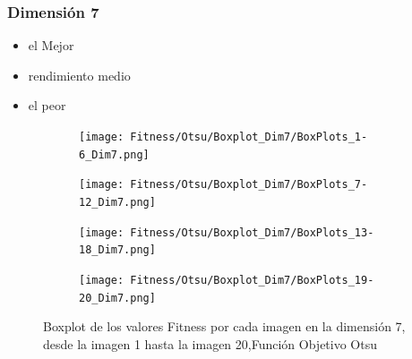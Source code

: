 \documentclass[conference]{IEEEtran}
\begin{document}
\subsubsection{Dimensión 7}
\begin{itemize}
	\item el Mejor
	\item rendimiento medio
	\item el peor
\end{itemize}
\begin{figure}
	\centering
	
	\begin{subfigure}{0.4\textwidth}
		\texttt{[image: Fitness/Otsu/Boxplot\_Dim7/BoxPlots\_1-6\_Dim7.png]}
	\end{subfigure}
	
	\begin{subfigure}{0.4\textwidth}
		\texttt{[image: Fitness/Otsu/Boxplot\_Dim7/BoxPlots\_7-12\_Dim7.png]}
	\end{subfigure}
	\begin{subfigure}{0.4\textwidth}
		\texttt{[image: Fitness/Otsu/Boxplot\_Dim7/BoxPlots\_13-18\_Dim7.png]}
	\end{subfigure}
	\begin{subfigure}{0.4\textwidth}
		\texttt{[image: Fitness/Otsu/Boxplot\_Dim7/BoxPlots\_19-20\_Dim7.png]}
		\vspace{-120pt} %
	\end{subfigure}
	\caption{Boxplot de los valores Fitness por cada imagen en la dimensión 7, desde la imagen 1 hasta la imagen 20,Función Objetivo Otsu}
	\label{fig:imagenes}    
\end{figure}
\end{document}
